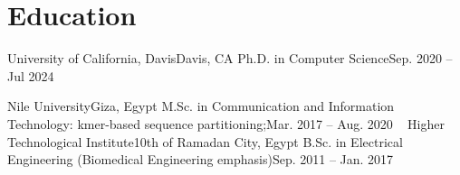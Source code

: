 \section{Education}
  \resumeSubHeadingListStart
    \resumeSubheading
      {University of California, Davis}{Davis, CA}
      {Ph.D. in Computer Science}{Sep. 2020 --  Jul 2024}
      \resumeItemListStart
      \resumeItemListEnd

    \resumeSubheading
      {Nile University}{Giza, Egypt}
      {M.Sc. in Communication and Information Technology: kmer-based sequence partitioning;}{Mar. 2017 -- Aug. 2020}
\
    \resumeSubheading
      {Higher Technological Institute}{10th of Ramadan City, Egypt}
      {B.Sc. in Electrical Engineering (Biomedical Engineering emphasis)}{Sep. 2011 -- Jan. 2017}
      \resumeItemListStart
      \resumeItemListEnd

  \resumeSubHeadingListEnd
